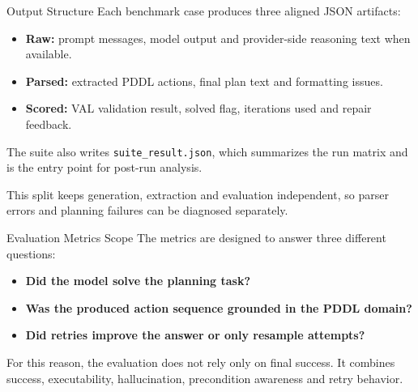 \documentclass{beamer}
\begin{document}
\begin{frame}{Output Structure}\footnotesize
    Each benchmark case produces three aligned JSON artifacts:
    \begin{itemize}
        \item \textbf{Raw:} prompt messages, model output and provider-side reasoning text when available.
        \item \textbf{Parsed:} extracted PDDL actions, final plan text and formatting issues.
        \item \textbf{Scored:} VAL validation result, solved flag, iterations used and repair feedback.
    \end{itemize}

    \vspace{0.25cm}
    The suite also writes \texttt{suite\_result.json}, which summarizes the run matrix and is the entry point for post-run analysis.

    \vspace{0.25cm}
    This split keeps generation, extraction and evaluation independent, so parser errors and planning failures can be diagnosed separately.
\end{frame}

\begin{frame}{Evaluation Metrics Scope}\footnotesize
    The metrics are designed to answer three different questions:
    \begin{itemize}
        \item \textbf{Did the model solve the planning task?}
        \item \textbf{Was the produced action sequence grounded in the PDDL domain?}
        \item \textbf{Did retries improve the answer or only resample attempts?}
    \end{itemize}

    \vspace{0.25cm}
    For this reason, the evaluation does not rely only on final success. It combines success, executability, hallucination, precondition awareness and retry behavior.
\end{frame}
\end{document}
